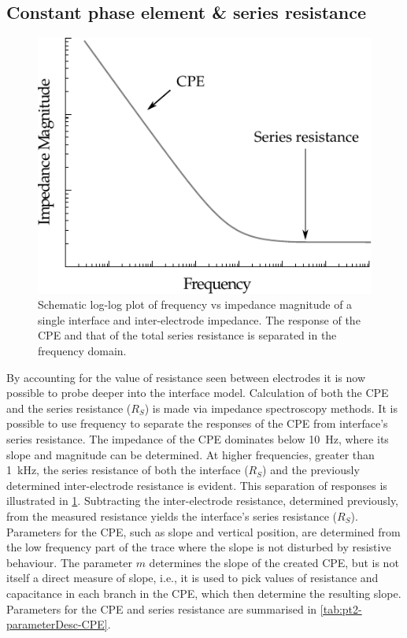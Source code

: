 

  \subsection{Constant phase element \& series resistance}


    \begin{figure}[h]
      \centering
      \includegraphics{content/pt2/07-InterfaceModel/graphics/graph_cpePlotGeneral}
      \caption{\label{fig:pt2-graph_cpePlotGeneral}Schematic log-log plot of frequency vs impedance magnitude of a single interface and inter-electrode impedance. The response of the CPE and that of the total series resistance is separated in the frequency domain.}
    \end{figure}
    By accounting for the value of resistance seen between electrodes it is now possible to probe deeper into the interface model.
    Calculation of both the CPE and the series resistance ($R_S$) is made via impedance spectroscopy methods.
    It is possible to use frequency to separate the responses of the CPE from interface's series resistance.
    The impedance of the CPE dominates below \SI{10}{\hertz}, where its slope and magnitude can be determined.
    At higher frequencies, greater than \SI{1}{\kilo\hertz}, the series resistance of both the interface ($R_S$) and the previously determined inter-electrode resistance is evident.
    This separation of responses is illustrated in \cref{fig:pt2-graph_cpePlotGeneral}.
    Subtracting the inter-electrode resistance, determined previously, from the measured resistance yields the interface's series resistance ($R_S$).
    Parameters for the CPE, such as slope and vertical position, are determined from the low frequency part of the trace where the slope is not disturbed by resistive behaviour.
    The parameter $m$ determines the slope of the created CPE, but is not itself a direct measure of slope, i.e., it is used to pick values of resistance and capacitance in each branch in the CPE, which then determine the resulting slope.
    Parameters for the CPE and series resistance are summarised in \cref{tab:pt2-parameterDesc-CPE}.

